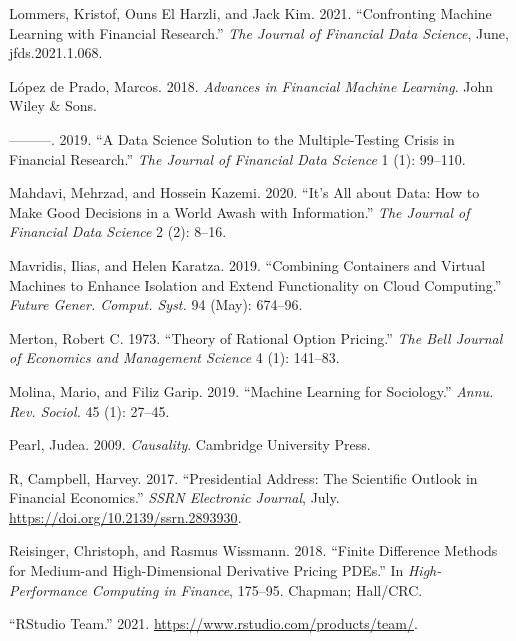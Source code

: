 \documentclass{article}
\newlength{\cslhangindent}
\newenvironment{CSLReferences}[2] %
 {%
  \setlength{\parindent}{0pt}
  \ifodd #1 \everypar{\setlength{\hangindent}{\cslhangindent}}\ignorespaces\fi
  \ifnum #2 > 0
  \setlength{\parskip}{#2\baselineskip}
  \fi
 }%
 {}
\begin{document}
\begin{CSLReferences}{1}{0}
\leavevmode{}%
Lommers, Kristof, Ouns El Harzli, and Jack Kim. 2021. {``Confronting
Machine Learning with Financial Research.''} \emph{The Journal of
Financial Data Science}, June, jfds.2021.1.068.

\leavevmode{}%
López de Prado, Marcos. 2018. \emph{Advances in Financial Machine
Learning}. John Wiley \& Sons.

\leavevmode{}%
---------. 2019. {``A Data Science Solution to the {Multiple-Testing}
Crisis in Financial Research.''} \emph{The Journal of Financial Data
Science} 1 (1): 99--110.

\leavevmode{}%
Mahdavi, Mehrzad, and Hossein Kazemi. 2020. {``It's All about Data: How
to Make Good Decisions in a World Awash with Information.''} \emph{The
Journal of Financial Data Science} 2 (2): 8--16.

\leavevmode{}%
Mavridis, Ilias, and Helen Karatza. 2019. {``Combining Containers and
Virtual Machines to Enhance Isolation and Extend Functionality on Cloud
Computing.''} \emph{Future Gener. Comput. Syst.} 94 (May): 674--96.

\leavevmode{}%
Merton, Robert C. 1973. {``Theory of Rational Option Pricing.''}
\emph{The Bell Journal of Economics and Management Science} 4 (1):
141--83.

\leavevmode{}%
Molina, Mario, and Filiz Garip. 2019. {``Machine Learning for
Sociology.''} \emph{Annu. Rev. Sociol.} 45 (1): 27--45.

\leavevmode{}%
Pearl, Judea. 2009. \emph{Causality}. Cambridge University Press.

\leavevmode{}%
R, Campbell, Harvey. 2017. {``{Presidential Address: The Scientific
Outlook in Financial Economics}.''} \emph{SSRN Electronic Journal},
July. \url{https://doi.org/10.2139/ssrn.2893930}.

\leavevmode{}%
Reisinger, Christoph, and Rasmus Wissmann. 2018. {``Finite Difference
Methods for Medium-and High-Dimensional Derivative Pricing {PDEs}.''} In
\emph{{High-Performance} Computing in Finance}, 175--95. Chapman;
Hall/CRC.

\leavevmode{}%
{``{RStudio} Team.''} 2021.
\url{https://www.rstudio.com/products/team/}.


\end{CSLReferences}
\end{document}
